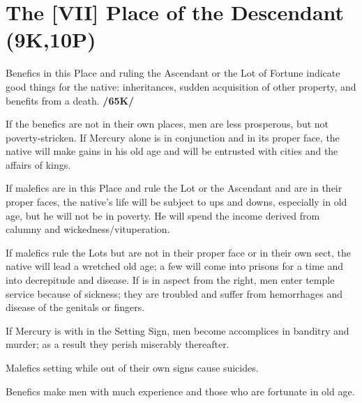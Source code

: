 \section{The [VII] Place of the Descendant (9K,10P)}

Benefics in this Place and ruling the Ascendant or the Lot of Fortune indicate good things for the native: inheritances, sudden acquisition of other property, and benefits from a death. \textbf{/65K/} 

If the benefics are not in their own places, men are less prosperous, but not poverty-stricken. If Mercury alone is in conjunction and in its proper face, the native will make gains in his old age and will be entrusted with cities and the affairs of kings. 

If malefics are in this Place and rule the Lot or the Ascendant and are in their proper faces, the native’s life will be subject to ups and downs, especially in old age, but he will not be in poverty. He will spend the income derived from calumny and wickedness/vituperation. 

If malefics rule the Lots but are not in their proper face or in their own sect, the native will lead a wretched old age; a few will come into prisons for a time and into decrepitude and disease. If \Jupiter\xspace is in aspect from the right, men
enter temple service because of sickness; they are troubled and suffer from hemorrhages and disease of the genitals or fingers. 

If Mercury is with \Mars\xspace in the Setting Sign, men become accomplices in banditry and murder; as a result they perish miserably thereafter. 

Malefics setting while out of their own signs cause suicides.

Benefics make men with much experience and those who are fortunate in old age.

\newpage